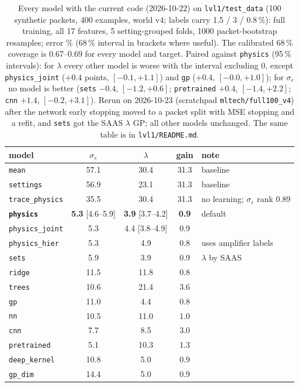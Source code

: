 \documentclass[10pt]{article}
\newcommand{\code}[1]{\texttt{#1}}
\newcommand{\se}{\sigma_e}
\begin{document}
\begin{table}[H]
\centering\small
\begin{tabular}{lcccl}
\toprule
model & $\se$ & $\lambda$ & gain & note \\
\midrule
\code{mean} & 57.1 & 30.4 & 31.3 & baseline \\
\code{settings} & 56.9 & 23.1 & 31.3 & baseline \\
\code{trace\_physics} & 35.5 & 30.4 & 31.3 & no learning; $\se$ rank 0.89 \\
\textbf{\code{physics}} & \textbf{5.3} [4.6--5.9] & \textbf{3.9} [3.7--4.2] & \textbf{0.9} & default \\
\code{physics\_joint} & 5.3 & 4.4 [3.8--4.9] & 0.9 & \\
\code{physics\_hier} & 5.3 & 4.9 & 0.8 & uses amplifier labels \\
\code{sets} & 5.9 & 3.9 & 0.9 & $\lambda$ by SAAS \\
\code{ridge} & 11.5 & 11.8 & 0.8 & \\
\code{trees} & 10.6 & 21.4 & 3.6 & \\
\code{gp} & 11.0 & 4.4 & 0.8 & \\
\code{nn} & 10.5 & 11.0 & 1.0 & \\
\code{cnn} & 7.7 & 8.5 & 3.0 & \\
\code{pretrained} & 5.1 & 10.3 & 1.3 & \\
\code{deep\_kernel} & 10.8 & 5.0 & 0.9 & \\
\code{gp\_dim} & 14.4 & 5.0 & 0.9 & \\
\bottomrule
\end{tabular}
\caption{Every model with the current code (2026-10-22) on \code{lvl1/test\_data} (100 synthetic packets, 400
examples, world v4; labels carry 1.5 / 3 / 0.8\,\%): full training, all 17 features, 5 setting-grouped folds, 1000
packet-bootstrap resamples; error \% (68\,\% interval in brackets where useful). The calibrated 68\,\% coverage is
0.67--0.69 for every model and target. Paired against \code{physics} (95\,\% intervals): for $\lambda$ every other
model is worse with the interval excluding 0, except \code{physics\_joint} ($+0.4$ points, $[-0.1, +1.1]$) and \code{gp}
($+0.4$, $[-0.0, +1.0]$); for $\se$ no model is better (\code{sets} $-0.4$, $[-1.2, +0.6]$; \code{pretrained} $+0.4$,
$[-1.4, +2.2]$; \code{cnn} $+1.4$, $[-0.2, +3.1]$). Rerun on 2026-10-23 (scratchpad \code{mltech/full100\_v4}) after the network early stopping moved to a packet split
with MSE stopping and a refit, and \code{sets} got the SAAS $\lambda$ GP; all other models unchanged. The same table is in
\code{lvl1/README.md}.}
\label{tab:full100}
\end{table}
\end{document}
